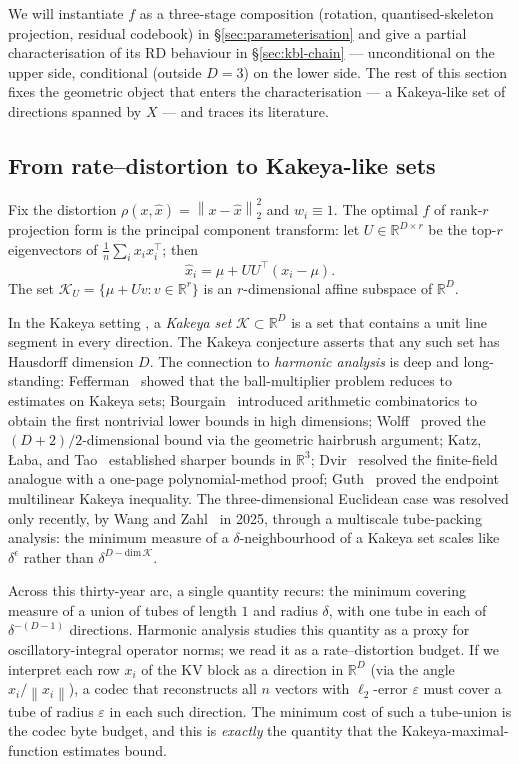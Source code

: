\documentclass[11pt,a4paper]{article}
\theoremstyle{definition}
\theoremstyle{plain}
\newcommand{\R}{\mathbb{R}}
\newcommand{\norm}[1]{\left\lVert#1\right\rVert}
\begin{document}
We will instantiate $f$ as a three-stage composition (rotation, quantised-skeleton projection, residual codebook) in \S\ref{sec:parameterisation} and give a partial characterisation of its RD behaviour in \S\ref{sec:kbl-chain} --- unconditional on the upper side, conditional (outside $D=3$) on the lower side. The rest of this section fixes the geometric object that enters the characterisation --- a Kakeya-like set of directions spanned by $X$ --- and traces its literature.

\subsection{From rate--distortion to Kakeya-like sets}
Fix the distortion $\rho(x, \hat{x}) = \norm{x - \hat{x}}_2^2$ and $w_i \equiv 1$. The optimal $f$ of rank-$r$ projection form is the principal component transform: let $U \in \R^{D \times r}$ be the top-$r$ eigenvectors of $\tfrac{1}{n}\sum_i x_i x_i^\top$; then
\begin{equation}
\label{eq:pca-skeleton}
\hat{x}_i = \mu + U U^\top (x_i - \mu).
\end{equation}
The set $\mathcal{K}_U = \{\mu + U v : v \in \R^r\}$ is an $r$-dimensional affine subspace of $\R^D$.

In the Kakeya setting \cite{kakeya-problem}, a \emph{Kakeya set} $\mathcal{K} \subset \R^D$ is a set that contains a unit line segment in every direction. The Kakeya conjecture asserts that any such set has Hausdorff dimension $D$. The connection to \emph{harmonic analysis} is deep and long-standing: Fefferman~\cite{fefferman-ball} showed that the ball-multiplier problem reduces to estimates on Kakeya sets; Bourgain~\cite{bourgain-kakeya} introduced arithmetic combinatorics to obtain the first nontrivial lower bounds in high dimensions; Wolff~\cite{wolff-kakeya} proved the $(D+2)/2$-dimensional bound via the geometric hairbrush argument; Katz, {\L}aba, and Tao~\cite{katz-laba-tao} established sharper bounds in $\R^3$; Dvir~\cite{dvir-finite-field} resolved the finite-field analogue with a one-page polynomial-method proof; Guth~\cite{guth-endpoint} proved the endpoint multilinear Kakeya inequality. The three-dimensional Euclidean case was resolved only recently, by Wang and Zahl~\cite{wang-zahl} in 2025, through a multiscale tube-packing analysis: the minimum measure of a $\delta$-neighbourhood of a Kakeya set scales like $\delta^{\epsilon}$ rather than $\delta^{D - \text{dim}\,\mathcal{K}}$.

Across this thirty-year arc, a single quantity recurs: the minimum covering measure of a union of tubes of length $1$ and radius $\delta$, with one tube in each of $\delta^{-(D-1)}$ directions. Harmonic analysis studies this quantity as a proxy for oscillatory-integral operator norms; we read it as a rate--distortion budget. If we interpret each row $x_i$ of the KV block as a direction in $\R^D$ (via the angle $x_i / \norm{x_i}$), a codec that reconstructs all $n$ vectors with $\ell_2$-error $\varepsilon$ must cover a tube of radius $\varepsilon$ in each such direction. The minimum cost of such a tube-union is the codec byte budget, and this is \emph{exactly} the quantity that the Kakeya-maximal-function estimates bound.
\end{document}
